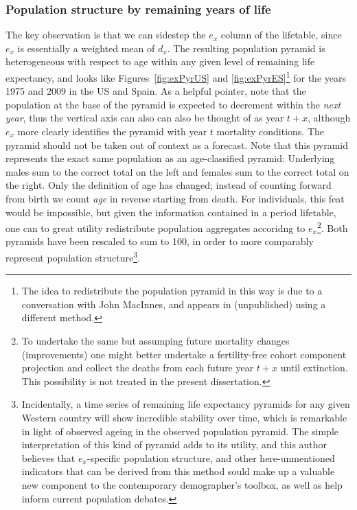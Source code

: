 \subsubsection{Population structure by remaining years of life}
The key
observation is that we can sidestep the $e_x$ column of the lifetable, since
$e_x$ is essentially a weighted mean of $d_x$. The resulting population pyramid
is heterogeneous with respect to age within any given level of remaining life
expectancy, and looks like
Figures~\ref{fig:exPyrUS} and \ref{fig:exPyrES}\footnote{The idea to
redistribute the population pyramid in this way is due to a conversation with 
John MacInnes, and appears in \citep{MacInnes2013pop} (unpublished) using a
different method.} for the years 1975 and 2009 in the US and Spain. As a helpful
pointer, note that the population at the base of the pyramid is expected to decrement
within the \textit{next year}, thus the vertical axis can also can also be
thought of as year $t+x$, although $e_x$ more clearly identifies the pyramid
with year $t$ mortality conditions. The pyramid should not be
taken out of context as a forecast. Note that this pyramid represents the exact same
population as an age-classified pyramid: Underlying males sum to the correct total on 
the left and females sum to the correct total on the right. Only the definition of age has
changed; instead of counting forward from birth we count \textit{age} in reverse
starting from death. For individuals, this feat would be impossible, but given
 the information contained in a period lifetable,  one can to great utility 
 redistribute population aggregates accoridng to $e_x$\footnote{To undertake
 the same but assumping future mortality changes (improvements) one might
 better undertake a fertility-free cohort component projection and collect the
 deaths from each future year $t+x$ until extinction. This possibility is not
 treated in the present dissertation.}. Both pyramids have been rescaled
 to sum to 100, in order to more comparably represent population structure\footnote{Incidentally, 
 a time series of remaining life expectancy pyramids for any given Western country will show 
 incredible stability over time, which is remarkable in light of observed ageing in the observed
  population pyramid. The simple interpretation of this kind of pyramid adds to its utility, and
   this author 
believes that $e_x$-specific population structure, and other here-unmentioned indicators 
that can be derived from this method sould make up a valuable new component to the contemporary
 demographer's toolbox, as well as help inform current population debates.}.

